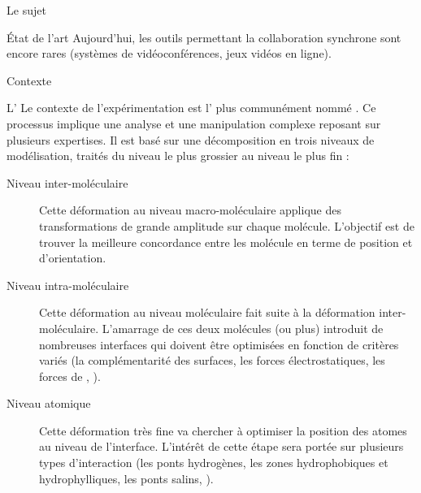 \documentclass[myfrancais]{mythesis}
\begin{document}
\begin{mychapter}{Le sujet}
\begin{mysection}{État de l'art}
			Aujourd'hui, les outils permettant la collaboration synchrone sont encore rares (systèmes de vidéoconférences, jeux vidéos en ligne).
		\end{mysection}
		\begin{mysection}{Contexte}
			\begin{mysubsection}{L'}
				Le contexte de l'expérimentation est l' plus communément nommé .
				Ce processus implique une analyse et une manipulation complexe reposant sur plusieurs expertises.
				Il est basé sur une décomposition en trois niveaux de modélisation, traités du niveau le plus grossier au niveau le plus fin :
				\begin{description}
					\item[Niveau inter-moléculaire] Cette déformation au niveau macro-moléculaire applique des transformations de grande amplitude sur chaque molécule.
						L'objectif est de trouver la meilleure concordance entre les molécule en terme de position et d'orientation.
					\item[Niveau intra-moléculaire] Cette déformation au niveau moléculaire fait suite à la déformation inter-moléculaire.
						L'amarrage de ces deux molécules (ou plus) introduit de nombreuses interfaces qui doivent être optimisées en fonction de critères variés (la complémentarité des surfaces, les forces électrostatiques, les forces de  , \myetc).
					\item[Niveau atomique] Cette déformation très fine va chercher à optimiser la position des atomes au niveau de l'interface.
						L'intérêt de cette étape sera portée sur plusieurs types d'interaction (les ponts hydrogènes, les zones hydrophobiques et hydrophylliques, les ponts salins, \myetc).
				\end{description}


\end{mysubsection}
\end{mysection}
\end{mychapter}
\end{document}
